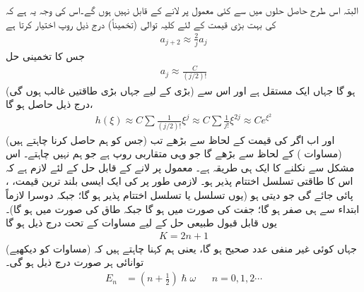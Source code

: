  البتہ اس طرح حاصل حلوں میں سے کئی معمول پر لانے کے قابل نہیں ہوں گے۔اس کی وجہ یہ ہے کہ  کی بہت بڑی قیمت کے لئے کلیہ توالی (تخمیناً) درج ذیل روپ اختیار کرتا ہے
\begin{align*}
a_{j+2}\approx\frac{2}{j}a_{j}
\end{align*}
جس کا تخمینی حل
\begin{align*}
a_{j}\approx\frac{C}{(j/2)!}
\end{align*}
ہو گا جہاں  ایک مستقل ہے اور اس سے (بڑی  کے لیے جہاں بڑی طاقتیں غالب ہوں گی) درج ذیل حاصل ہو گا،
\begin{align*}
h(\xi)\approx C\sum\frac{1}{(j/2)!}\xi^{j}\approx C\sum\frac{1}{j!}\xi^{2j}\approx Ce^{\xi^{2}}
\end{align*}
اور اب اگر  کی قیمت  کے لحاظ سے بڑھے تب  (جس کو ہم حاصل کرنا چاہتے ہیں) 
  (مساوات ) کے لحاظ سے بڑھے گا جو وہی متقاربی 
 روپ ہے جو ہم نہیں چاہتے۔ اس مشکل سے نکلنے کا ایک ہی طریقہ ہے۔ معمول پر لانے کے قابل حل کے لئے لازم ہے کہ اس کا طاقتی تسلسل اختتام پذیر ہو۔ لازمی طور پر  کی ایک ایسی بلند ترین قیمت، ، پائی جائے گی جو  دیتی ہو (یوں  تسلسل یا  تسلسل اختتام پذیر ہو گا؛ جبکہ دوسرا لازماً ابتداء سے ہی صفر ہو گا؛ جفت  کی صورت میں  ہو گا جبکہ طاق  کی صورت میں  ہو گا)۔ یوں قابل قبول طبیعی حل کے لیے مساوات  کے تحت درج ذیل ہو گا
\begin{align*}
K=2n+1
\end{align*}
 جہاں  کوئی غیر منفی عدد صحیح ہو گا، یعنی ہم کہنا چاہتے ہیں کہ (مساوات  کو دیکھیے) توانائی ہر صورت درج ذیل ہو گی۔
\begin{align}
E_{n}&=(n+\tfrac{1}{2} )\hslash\omega && n=0,1,2\cdots
\end{align}
